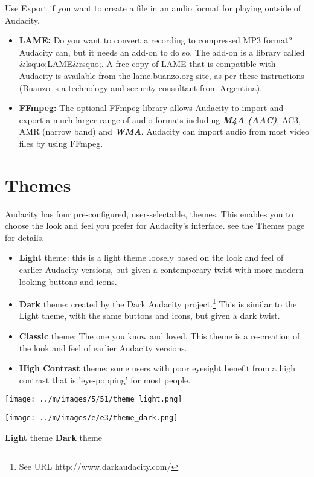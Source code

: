 \documentclass[twocolumn]{book}
\begin{document}
Use Export if you want to create a file in an audio format for playing outside of Audacity.
\begin{itemize}
\item  \textbf{LAME:} Do you want to convert a recording to compressed MP3 format? Audacity can, but it needs an add-on to do so.  The add-on is a library called \&lsquo;LAME\&rsquo;.  A free copy of LAME that is compatible with Audacity is available from the   lame.buanzo.org site, as per these instructions (Buanzo is a technology and security consultant from Argentina). 
\item  \textbf{FFmpeg:} The optional FFmpeg library allows Audacity to import and export a much larger range of audio formats including \textit{\textbf{M4A (AAC)}}, AC3, AMR (narrow band) and \textit{\textbf{WMA}}. Audacity can import audio from most video files by using FFmpeg.
\end{itemize}



\section{Themes}


Audacity has four pre-configured, user-selectable, themes.  This enables you to choose the look and feel you prefer for Audacity's interface. see the Themes page for details.
\begin{itemize}
\item \textbf{Light} theme: this is a light theme loosely based on the look and feel of earlier Audacity versions, but given a contemporary twist with more modern-looking buttons and icons. 
\item \textbf{Dark} theme: created by the Dark Audacity project.\footnote{See URL http://www.darkaudacity.com/} This is similar to the Light theme, with the same buttons and icons, but given a dark twist.
\item \textbf{Classic} theme: The one you know and loved. This theme is a re-creation of the look and feel of earlier Audacity versions. 
\item \textbf{High Contrast} theme: some users with poor eyesight benefit from a high contrast that is 'eye-popping' for most people.
\end{itemize}

\* \* \* \* \par\texttt{[image: ../m/images/5/51/theme\_light.png]}\par
\* \* \* \* \par\texttt{[image: ../m/images/e/e3/theme\_dark.png]}\par
\* \* \* \* 
\textbf{Light} theme
\* \* \* \* 
\textbf{Dark} theme
\end{document}
